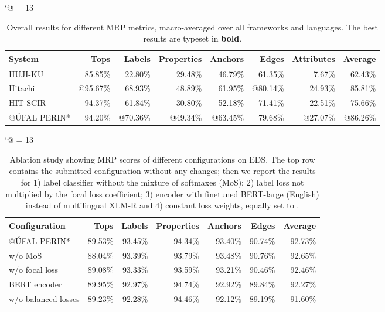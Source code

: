 \documentclass[11pt,a4paper]{article}
\begin{document}
\begin{table*}[t]
\small
\centering
\def\-{\rule[.5ex]{2em}{0.5pt}\kern1em}
\catcode`@ = 13
\begin{tabular}{@{}lrrrrrrr@{}}
\toprule
\textbf{System} & \textbf{Tops} & \textbf{Labels} & \textbf{Properties} & \textbf{Anchors} & \textbf{Edges} & \textbf{Attributes} & \textbf{Average} \\ \midrule
HUJI-KU \cite{Arv:Cui:Her:20} & 85.85\% & 22.80\% & 29.48\% & 46.79\% & 61.35\% &  7.67\% & 62.43\% \\
Hitachi \cite{Oza:Mor:Kor:20} &@95.67\% & 68.93\% & 48.89\% & 61.95\% &@80.14\% & 24.93\% & 85.81\% \\
HIT-SCIR \cite{Dou:Fen:Ji:20} & 94.37\% & 61.84\% & 30.80\% & 52.18\% & 71.41\% & 22.51\% & 75.66\% \\
@ÚFAL PERIN*  & 94.20\% &@70.36\% &@49.34\% &@63.45\% & 79.68\% &@27.07\% &@86.26\% \\ \bottomrule
\end{tabular}\caption{Overall results for different MRP metrics, macro-averaged over all frameworks and languages. The best results are typeset in \textbf{bold}.}
\label{tab:score_result}
\end{table*}

\begin{table*}[t!]
\centering
\catcode`@ = 13
\small
\begin{tabular}{@{}lrrrrrr@{}}
\toprule
\textbf{Configuration}     & \textbf{Tops}    & \textbf{Labels}  & \textbf{Properties} & \textbf{Anchors} & \textbf{Edges}   & \textbf{Average} \\ \midrule
@ÚFAL PERIN*             & 89.53\%  & 93.45\%  & 94.34\%  & 93.40\%  & 90.74\%  & 92.73\% \\
w/o MoS             & 88.04\%  & 93.39\%  & 93.79\%  & 93.48\%  & 90.76\%  & 92.65\% \\
w/o focal loss      & 89.08\%  & 93.33\%  & 93.59\%  & 93.21\%  & 90.46\%  & 92.46\% \\
BERT encoder        & 89.95\%  & 92.97\%  & 94.74\%  & 92.92\%  & 89.84\%  & 92.27\% \\
w/o balanced losses & 89.23\%  & 92.28\%  & 94.46\%  & 92.12\%  & 89.19\%  & 91.60\% \\
\bottomrule
\end{tabular}\caption{Ablation study showing MRP scores of different configurations on EDS. The top row contains the submitted configuration without any changes; then we report the results for 1) label classifier without the mixture of softmaxes (MoS); 2) label loss not multiplied by the focal loss coefficient; 3) encoder with finetuned BERT-large (English) instead of multilingual XLM-R and 4) constant loss weights, equally set to .}
\label{tab:ablation}
\end{table*}
\end{document}
